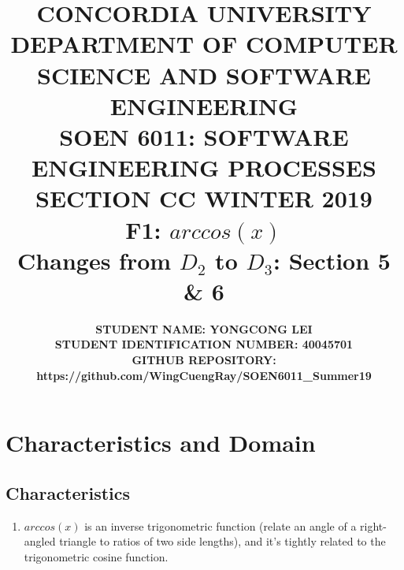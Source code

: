\documentclass[10pt]{article}
\title{{\large \textbf{CONCORDIA UNIVERSITY \\ DEPARTMENT OF COMPUTER SCIENCE AND SOFTWARE ENGINEERING \\ SOEN 6011: SOFTWARE ENGINEERING PROCESSES \\ SECTION CC WINTER 2019 \\ F1: $arccos(x)$}  \\ Changes from $D_2$ to $D_3$: Section 5 \& 6 }}
\author{\normalsize \textbf {STUDENT NAME: YONGCONG LEI} \\ \normalsize \textbf{STUDENT IDENTIFICATION NUMBER: 40045701} \\ \normalsize \textbf{GITHUB REPOSITORY: https://github.com/WingCuengRay/SOEN6011\_Summer19}}
\date{}
\begin{document}
\maketitle

\section{Characteristics and Domain}
\subsection{Characteristics}

\begin{enumerate}
    \item $arccos(x)$ is an inverse trigonometric function (relate an angle of a right-angled triangle to ratios of two side lengths), and it's tightly related to the trigonometric cosine function.
    

\end{enumerate}
\end{document}
